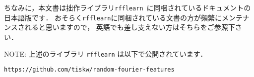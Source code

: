 ちなみに，本文書は拙作ライブラリ\texttt{rfflearn}~\cite{rfflearn}に同梱されているドキュメントの日本語版です．
おそらく\texttt{rfflearn}に同梱されている文書の方が頻繁にメンテナンスされると思いますので，
英語でも差し支えない方はそちらをご参照下さい．

\begin{displayquote}\footnotesize\textsf{NOTE:}
    上述のライブラリ \texttt{rfflearn} は以下で公開されています．
    \begin{center}
        \texttt{https://github.com/tiskw/random-fourier-features}
    \end{center}
\end{displayquote}

